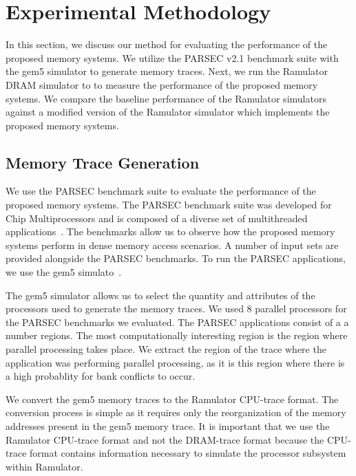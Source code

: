 \section{Experimental Methodology}
\label{sec:experimentalmethodology}

In this section, we discuss our method for evaluating the performance of the proposed memory systems. We utilize the PARSEC v2.1 benchmark suite with the gem5 simulator to generate memory traces. Next, we run the Ramulator DRAM simulator to to measure the performance of the proposed memory systems. We compare the baseline performance of the Ramulator simulators against a modified version of the Ramulator simulator which implements the proposed memory systems.

\subsection{Memory Trace Generation}

We use the PARSEC benchmark suite to evaluate the performance of the proposed memory systems. The PARSEC benchmark suite was developed for Chip Multiprocessors and is composed of a diverse set of multithreaded applications~\cite{bienia09parsec2}. The benchmarks allow us to observe how the proposed memory systems perform in dense memory access scenarios. A number of input sets are provided alongside the PARSEC benchmarks. To run the PARSEC applications, we use the gem5 simulato~\cite{parsec_2_1_m5}.

The gem5 simulator allows us to select the quantity and attributes of the processors used to generate the memory traces. We used 8 parallel processors for the PARSEC benchmarks we evaluated. The PARSEC applications consist of a a number regions. The most computationally interesting region is the region where parallel processing takes place. We extract the region of the trace where the application was performing parallel processing, as it is this region where there is a high probablity for bank conflicts to occur. 


We convert the gem5 memory traces to the Ramulator CPU-trace format. The conversion process is simple as it requires only the reorganization of the memory addresses present in the gem5 memory trace. It is important that we use the Ramulator CPU-trace format and not the DRAM-trace format because the CPU-trace format contains information necessary to simulate the processor subsystem within Ramulator.

